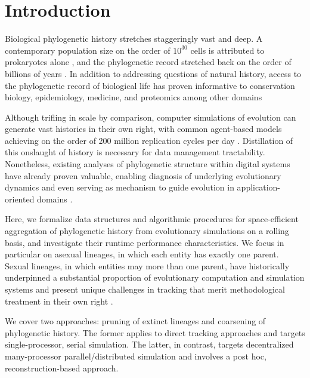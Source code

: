 \section{Introduction} \label{sec:introduction}

Biological phylogenetic history stretches staggeringly vast and deep.
A contemporary population size on the order of $10^{30}$ cells is attributed to prokaryotes alone \citep{whitman1998prokaryotes}, and the phylogenetic record stretched back on the order of billions of years \citep{arndt2012processes}.
In addition to addressing questions of natural history, access to the phylogenetic record of biological life has proven informative to conservation biology, epidemiology, medicine, and proteomics among other domains \citep{STAMATAKIS2005phylogenetics}

Although trifling in scale by comparison, computer simulations of evolution can generate vast histories in their own right, with common agent-based models achieving on the order of 200 million replication cycles per day \citep{ofria2009avida}.
Distillation of this onslaught of history is necessary for data management tractability.
Nonetheless, existing analyses of phylogenetic structure within digital systems have already proven valuable, enabling diagnosis of underlying evolutionary dynamics \cite{moreno2023toward,hernandez2022can,shahbandegan2022untangling} and even serving as mechanism to guide evolution in application-oriented domains \cite{lalejini2024phylogeny,lalejini2024runtime,murphy2008simple,burke2003increased}.

Here, we formalize data structures and algorithmic procedures for space-efficient aggregation of phylogenetic history from evolutionary simulations on a rolling basis, and investigate their runtime performance characteristics.
We focus in particular on asexual lineages, in which each entity has exactly one parent.
Sexual lineages, in which entities may more than one parent, have historically underpinned a substantial proportion of evolutionary computation and simulation systems \citep{koza1994genetic,jefferson1990evolution} and present unique challenges in tracking that merit methodological treatment in their own right \citep{godin2019apoget,moreno2024methods,mcphee2018detailed}.

We cover two approaches: pruning of extinct lineages and coarsening of phylogenetic history.
The former applies to direct tracking approaches and targets single-processor, serial simulation.
The latter, in contrast, targets decentralized many-processor parallel/distributed simulation and involves a post hoc, reconstruction-based approach.

